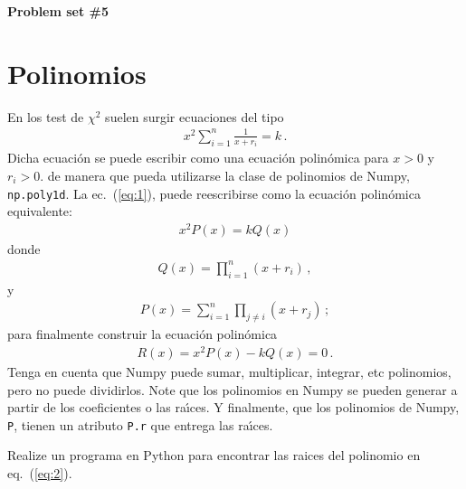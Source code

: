 \documentclass[12pt]{article}
\begin{document}
\noindent{}\hrulefill{}
\begin{flushright}
  \textbf{\large{Problem set \#5}}
\end{flushright}
\tableofcontents{}
\noindent{}\hrulefill{}
\section{Polinomios}
En los test de $\chi^2$ suelen surgir ecuaciones del tipo
\begin{align}
\label{eq:1}
  x^2\sum_{i=1}^n\frac{1}{x+r_i}=k\,.
\end{align}
Dicha ecuaci\'on se puede escribir como una ecuaci\'on polin\'omica para $x>0$ y $r_i>0$. de manera que pueda utilizarse la clase de polinomios de Numpy, \texttt{np.poly1d}. La ec.~(\ref{eq:1}), puede reescribirse como la ecuaci\'on polin\'omica equivalente:
\begin{align}
  x^2P(x)=k Q(x)
\end{align}
donde
\begin{align}
  Q(x)=\prod_{i=1}^n(x+r_i)\,,
\end{align}
y
\begin{align}
  P(x)=\sum_{i=1}^n\prod_{j\neq i}(x+r_j)\,;
\end{align}
para finalmente construir la ecuaci\'on polin\'omica
\begin{align}
  R(x)= x^2P(x)-k Q(x)=0\,.
  \label{eq:2}
\end{align}
Tenga en cuenta que Numpy puede sumar, multiplicar, integrar, etc polinomios, pero no puede dividirlos. Note que los polinomios en Numpy se pueden generar a partir de los coeficientes o las ra\'\i ces. Y finalmente, que  los polinomios de Numpy, \texttt{P}, tienen un atributo \texttt{P.r} que entrega las ra\'\i ces. 

Realize un programa en Python para encontrar las raices del polinomio en eq.~(\ref{eq:2}).
\end{document}
